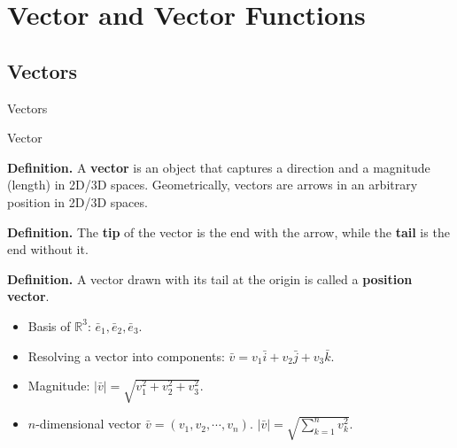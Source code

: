 \documentclass{beamer}
\begin{document}
\section{Vector and Vector Functions}
    \subsection{Vectors} 

    \begin{frame}[label=4]{Vectors}
        \begin{block}{Vector}
            \par \textbf{Definition.} A \textbf{vector} is an object that captures a direction and a magnitude (length) in 2D/3D spaces. Geometrically, vectors are arrows in an arbitrary position in 2D/3D spaces.

            \par \textbf{Definition.} The \textbf{tip} of the vector is the end with the arrow, while the \textbf{tail} is the end without it.

            \par \textbf{Definition.} A vector drawn with its tail at the origin is called a \textbf{position vector}.
        \end{block}

        \begin{itemize}
            \item Basis of $\mathbb{R}^3$: $\bar{e}_1,\bar{e}_2,\bar{e}_3$.
            \item Resolving a vector into components: $\bar{v} = v_1 \bar{i} + v_2 \bar{j} + v_3 \bar{k}$.
            \item Magnitude: $\left| \bar{v} \right| = \sqrt{v_1^2 + v_2^2 + v_3^2}$.
            \item $n$-dimensional vector $\bar{v} = (v_1,v_2,\cdots,v_n)$. $\left| \bar{v} \right| = \sqrt{\sum\limits_{k=1}^{n}v_k^2}$.
        \end{itemize}
    \end{frame}
\end{document}
